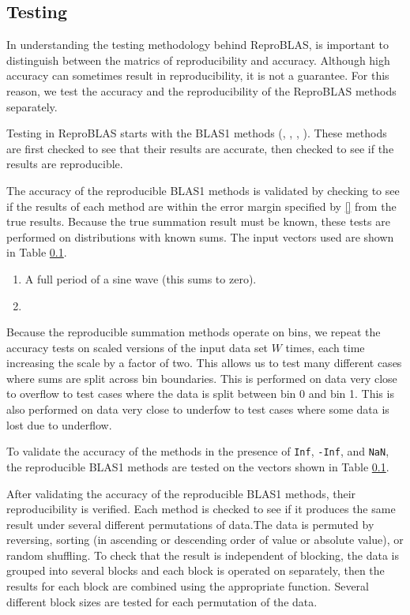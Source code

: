 \subsection{Testing}
  In understanding the testing methodology behind ReproBLAS, is important to distinguish between the matrics of reproducibility and accuracy. Although high accuracy can sometimes result in reproducibility, it is not a guarantee. For this reason, we test the accuracy and the reproducibility of the ReproBLAS methods separately.

  Testing in ReproBLAS starts with the BLAS1 methods (, , , ). These methods are first checked to see that their results are accurate, then checked to see if the results are reproducible.

  The accuracy of the reproducible BLAS1 methods is validated by checking to see if the results of each method are within the error margin specified by \eqref{} from the true results. Because the true summation result must be known, these tests are performed on distributions with known sums. The input vectors used are shown in Table \ref{}. 
  \begin{enumerate}
    \item A full period of a sine wave (this sums to zero).
    \item 
  \end{enumerate}
  Because the reproducible summation methods operate on bins, we repeat the accuracy tests on scaled versions of the input data set $W$ times, each time increasing the scale by a factor of two. This allows us to test many different cases where sums are split across bin boundaries. This is performed on data very close to overflow to test cases where the data is split between bin 0 and bin 1. This is also performed on data very close to underfow to test cases where some data is lost due to underflow.

  To validate the accuracy of the methods in the presence of \texttt{Inf}, \texttt{-Inf}, and \texttt{NaN}, the reproducible BLAS1 methods are tested on the vectors shown in Table \ref{}.

  After validating the accuracy of the reproducible BLAS1 methods, their reproducibility is verified. Each method is checked to see if it produces the same result under several different permutations of data.The data is permuted by reversing, sorting (in ascending or descending order of value or absolute value), or random shuffling. To check that the result is independent of blocking, the data is grouped into several blocks and each block is operated on separately, then the results for each block are combined using the appropriate function. Several different block sizes are tested for each permutation of the data.

